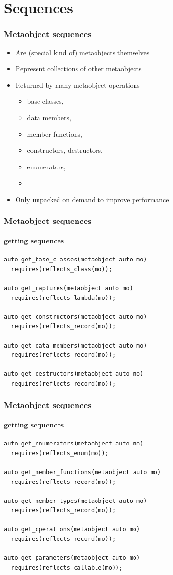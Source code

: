 \documentclass[compress,table,xcolor=table]{beamer}
\begin{document}
\section{Sequences}
\begin{frame}
  \frametitle{Metaobject sequences}
  \larger
  \begin{itemize}
    \item Are (special kind of) metaobjects themselves
    \item Represent collections of other metaobjects
    \item Returned by many metaobject operations
    \begin{itemize}
      \smaller
      \item base classes,
      \item data members,
      \item member functions,
      \item constructors, destructors,
      \item enumerators,
      \item \ldots
    \end{itemize}
    \item Only unpacked on demand to improve performance
  \end{itemize}
\end{frame}
\begin{frame}[fragile]
  \frametitle{Metaobject sequences}
  \framesubtitle{getting sequences}
  \begin{lstlisting}[language=c++2x,basicstyle=\small\ttfamily]
auto get_base_classes(metaobject auto mo)
  requires(reflects_class(mo));

auto get_captures(metaobject auto mo)
  requires(reflects_lambda(mo));

auto get_constructors(metaobject auto mo)
  requires(reflects_record(mo));

auto get_data_members(metaobject auto mo)
  requires(reflects_record(mo));

auto get_destructors(metaobject auto mo)
  requires(reflects_record(mo));
  \end{lstlisting}
\end{frame}
\begin{frame}[fragile]
  \frametitle{Metaobject sequences}
  \framesubtitle{getting sequences}
  \begin{lstlisting}[language=c++2x,basicstyle=\small\ttfamily]
auto get_enumerators(metaobject auto mo)
  requires(reflects_enum(mo));

auto get_member_functions(metaobject auto mo)
  requires(reflects_record(mo));

auto get_member_types(metaobject auto mo)
  requires(reflects_record(mo));

auto get_operations(metaobject auto mo)
  requires(reflects_record(mo));

auto get_parameters(metaobject auto mo)
  requires(reflects_callable(mo));
  \end{lstlisting}
\end{frame}
\end{document}
